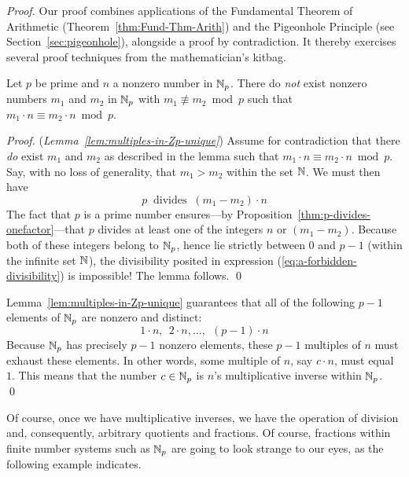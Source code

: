 \begin{proof}
Our proof combines applications of the Fundamental Theorem of Arithmetic (Theorem~\ref{thm:Fund-Thm-Arith}) and the Pigeonhole Principle (see Section~\ref{sec:pigeonhole}), alongside a proof by contradiction.  It thereby exercises several proof techniques from the mathematician's kitbag.
 

\begin{lemma}
\label{lem:multiples-in-Zp-unique}
Let $p$ be prime and $n$ a nonzero number in $\mathbb{N}_p$.  There do {\em not} exist nonzero numbers $m_1$ and $m_2$ in $\mathbb{N}_p$ with $m_1 \not\equiv m_2 \bmod p$ such that $m_1 \cdot n \equiv m_2 \cdot n \bmod p$.
\end{lemma}

\begin{proof} ({\em Lemma~\ref{lem:multiples-in-Zp-unique}})
Assume for contradiction that there {\em do} exist $m_1$ and $m_2$ as described in the lemma
such that $m_1 \cdot n \equiv m_2 \cdot n \bmod p$.  Say, with no loss of generality, that $m_1 > m_2$ within the set $\mathbb{N}$.  We must then have
\begin{equation}
\label{eq:a-forbidden-divisibility}
p \ \mbox{ divides } \ (m_1 - m_2) \cdot n
\end{equation}
The fact that $p$ is a prime number ensures---by Proposition~\ref{thm:p-divides-onefactor}---that $p$ divides at least one of the integers $n$ or $(m_1 - m_2)$.  Because both of these integers belong to $\mathbb{N}_p$, hence lie strictly between $0$ and $p-1$ (within the infinite set $\mathbb{N}$), the divisibility posited in expression
(\ref{eq:a-forbidden-divisibility}) is impossible!  The lemma follows.  \qed
\end{proof}

Lemma~\ref{lem:multiples-in-Zp-unique} guarantees that all of the following $p-1$ elements of $\mathbb{N}_p$ are nonzero and distinct:
\[ 1 \cdot n, \ \ 2 \cdot n, \ldots, \ \ (p-1) \cdot n \]
Because $\mathbb{N}_p$ has precisely $p-1$ nonzero elements, these $p-1$ multiples of $n$ must exhaust these elements.  In other words, some multiple of $n$, say $c \cdot n$, must equal $1$.  This means that the number $c \in \mathbb{N}_p$ is $n$'s multiplicative inverse within $\mathbb{N}_p$.  \qed
\end{proof}

\medskip

Of course, once we have multiplicative inverses, we have the operation of division and, consequently, arbitrary quotients and fractions.  Of course, fractions within finite number systems such as $\mathbb{N}_p$ are going to look strange to our eyes, as the following example indicates.

